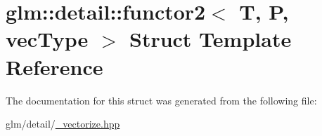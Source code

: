 \hypertarget{structglm_1_1detail_1_1functor2}{\section{glm\-:\-:detail\-:\-:functor2$<$ T, P, vec\-Type $>$ Struct Template Reference}
\label{structglm_1_1detail_1_1functor2}
}


The documentation for this struct was generated from the following file\-:\begin{DoxyCompactItemize}
\item 
glm/detail/\hyperlink{__vectorize_8hpp}{\-\_\-vectorize.\-hpp}\end{DoxyCompactItemize}

